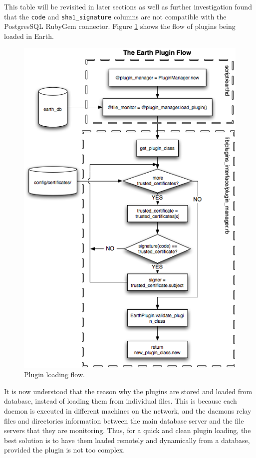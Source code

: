 \documentclass{article}
\begin{document}
This table will be revisited in later sections as well as further investigation found that the \texttt{code} and \texttt{sha1\_signature} columns are not compatible with the PostgresSQL RubyGem connector. Figure \ref{fig:flow} shows the flow of plugins being loaded in Earth.

\begin{figure}[ht]
    \centering
    \includegraphics[scale=0.7]{flow.png}
    \caption{Plugin loading flow.}
    \label{fig:flow}
\end{figure}

It is now understood that the reason why the plugins are stored and loaded from database, instead of loading them from individual files. This is because each daemon is executed in different machines on the network, and the daemons relay files and directories information between the main database server and the file servers that they are monitoring. Thus, for a quick and clean plugin loading, the best solution is to have them loaded remotely and dynamically from a database, provided the plugin is not too complex. 
\end{document}
